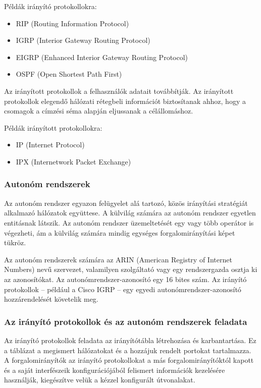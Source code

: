Példák irányító protokollokra:
\begin{itemize}[nosep]
	\item RIP (Routing Information Protocol)
	\item IGRP (Interior Gateway Routing Protocol)
	\item EIGRP (Enhanced Interior Gateway Routing Protocol)
	\item OSPF (Open Shortest Path First)
\end{itemize}

Az irányított protokollok a felhasználók adatait továbbítják. Az irányított protokollok
elegendő hálózati rétegbeli információt biztosítanak ahhoz, hogy a csomagok a címzési séma
alapján eljussanak a célállomáshoz.

Példák irányított protokollokra:
\begin{itemize}[nosep]
	\item IP (Internet Protocol)
	\item IPX (Internetwork Packet Exchange)
\end{itemize}

\subsubsection{Autonóm rendszerek}
Az autonóm rendszer egyazon felügyelet alá tartozó, közös irányítási stratégiát alkalmazó
hálózatok együttese. A külvilág számára az autonóm rendszer egyetlen entitásnak látszik. Az
autonóm rendszer üzemeltetését egy vagy több operátor is végezheti, ám a külvilág számára
mindig egységes forgalomirányítási képet tükröz.

Az autonóm rendszerek számára az ARIN (American Registry of Internet Numbers) nevű
szervezet, valamilyen szolgáltató vagy egy rendszergazda osztja ki az azonosítókat. Az
autonómrendszer-azonosító egy 16 bites szám. Az irányító protokollok – például a Cisco
IGRP – egy egyedi autonómrendszer-azonosító hozzárendelését követelik meg.

\subsubsection{Az irányító protokollok és az autonóm rendszerek feladata}
Az irányító protokollok feladata az irányítótábla létrehozása és karbantartása. Ez a táblázat a
megismert hálózatokat és a hozzájuk rendelt portokat tartalmazza. A forgalomirányítók az
irányító protokollokat a más forgalomirányítóktól kapott és a saját interfészeik
konfigurációjából felismert információk kezelésére használják, kiegészítve velük a kézzel
konfigurált útvonalakat.

